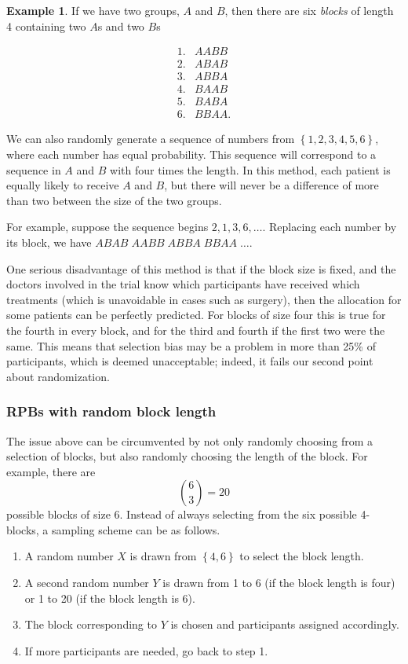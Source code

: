\documentclass[
  openany]{book}
\providecommand{\tightlist}{%
  \setlength{\itemsep}{0pt}\setlength{\parskip}{0pt}}
\theoremstyle{definition}
\theoremstyle{definition}
\newtheorem{example}{Example}[chapter]
\theoremstyle{definition}
\theoremstyle{definition}
\theoremstyle{remark}
\begin{document}
\begin{example}
If we have two groups, \(A\) and \(B\), then there are six \emph{blocks} of length 4 containing two \(A\)s and two \(B\)s

\[
\begin{aligned}
1.& AABB\\
2.& ABAB\\
3.& ABBA\\
4.& BAAB\\
5.& BABA\\
6.& BBAA.
\end{aligned}
\]

We can also randomly generate a sequence of numbers from \(\left\lbrace 1, 2, 3, 4, 5, 6 \right\rbrace\), where each number has equal probability. This sequence will correspond to a sequence in \(A\) and \(B\) with four times the length. In this method, each patient is equally likely to receive \(A\) and \(B\), but there will never be a difference of more than two between the size of the two groups.

For example, suppose the sequence begins \(2,1,3,6,\ldots\). Replacing each number by its block, we have \(ABAB\;AABB\;ABBA\;BBAA\;\ldots\).
\end{example}

One serious disadvantage of this method is that if the block size is fixed, and the doctors involved in the trial know which participants have received which treatments (which is unavoidable in cases such as surgery), then the allocation for some patients can be perfectly predicted. For blocks of size four this is true for the fourth in every block, and for the third and fourth if the first two were the same. This means that selection bias may be a problem in more than 25\% of participants, which is deemed unacceptable; indeed, it fails our second point about randomization.

\subsubsection{RPBs with random block length}\label{rpbs-with-random-block-length}

The issue above can be circumvented by not only randomly choosing from a selection of blocks, but also randomly choosing the length of the block. For example, there are
\[ \binom{6}{3} = 20\]
possible blocks of size 6. Instead of always selecting from the six possible 4-blocks, a sampling scheme can be as follows.

\begin{enumerate}
\def\labelenumi{\arabic{enumi}.}
\tightlist
\item
  A random number \(X\) is drawn from \(\left\lbrace 4,6\right\rbrace\) to select the block length.
\item
  A second random number \(Y\) is drawn from 1 to 6 (if the block length is four) or 1 to 20 (if the block length is 6).
\item
  The block corresponding to \(Y\) is chosen and participants assigned accordingly.
\item
  If more participants are needed, go back to step 1.
\end{enumerate}
\end{document}
